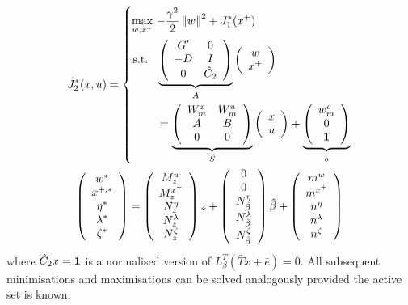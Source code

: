 \documentclass[journal]{IEEEtran}
\providecommand{\norm}[1]{\left\|#1\right\|}
\theoremstyle{remark}
\theoremstyle{definition}
\begin{document}
\begin{gather*}
  \hat J_2^\ast(x,u) = \left\{\begin{split}
  \max_{w,x^+} \ & {-\frac{\gamma^2}{2}}\norm{w}^2 + J_{1}^\ast(x^+)\\
  \text{s.t. }\ & 
  \underbrace{\left(\begin{array}{cc}
  G^\prime & 0 \\ -D & I \\
  0 & \hat C_2
  \end{array}\right)}_{\bar A}
  \left(\begin{array}{c}w\\ x^+\end{array}\right)
  \\&= \underbrace{\left(\begin{array}{cc}W_m^x & W_m^u \\ A & B \\ 0 & 0\end{array}\right)}_{
  \bar S
  }
  \left(\begin{array}{c}x \\ u \end{array}\right) + \underbrace{\left(\begin{array}{c}
  w_m^c \\ 0 \\ {\bf{1}}\end{array}\right)}_{\bar b}
  \end{split}\right.
\\
  \left(\begin{array}{c}
  w^\ast \\
  x^{+,\ast} \\
  \eta^\ast \\
  \lambda^\ast\\
  \zeta^\ast
  \end{array}\right) = \left(\begin{array}{c}M^w_z\\ M^{x^+}_z \\ N^{\eta}_z \\ N^{\lambda}_z \\ N^{\zeta}_z
  \end{array}\right)z + 
  \left(\begin{array}{c}0\\ 0 \\ N^{\eta}_{\hat\beta} \\ N^{\lambda}_{\hat\beta} \\ N^\zeta_{\hat\beta}
  \end{array}\right)\hat\beta + \left(\begin{array}{c}m^w\\ m^{x^+} \\ n^{\eta} \\ n^{\lambda}\\ n^\zeta
  \end{array}\right)
\end{gather*}
%
where $\hat C_2 x = {\bf{1}}$ is a normalised version of $L^T_\beta(\bar T x + \bar e) = 0$.
All subsequent minimisations and maximisations can be solved analogously provided the active set is
known.
%
\end{document}
